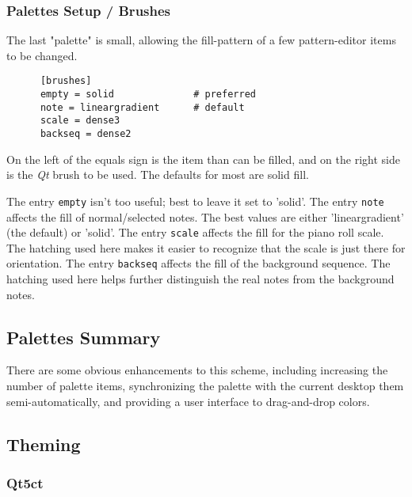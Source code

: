 \subsubsection{Palettes Setup / Brushes}
\label{subsubsec:palettes_setup_brushes}

   The last "palette" is small, allowing the fill-pattern of a few pattern-editor
   items to be changed.

   \begin{verbatim}
      [brushes]
      empty = solid              # preferred
      note = lineargradient      # default
      scale = dense3
      backseq = dense2
   \end{verbatim}

   On the left of the equals sign is the item than can be filled, and on the
   right side is the \textsl{Qt} brush to be used.  The defaults for most are
   solid fill.

   The entry \texttt{empty} isn't too useful; best to leave it set to 'solid'.
   The entry \texttt{note} affects the fill of normal/selected notes.
   The best values are either 'lineargradient' (the default) or 'solid'.
   The entry \texttt{scale} affects the fill for the piano roll scale.  The
   hatching used here makes it easier to recognize that the scale is just there
   for orientation.
   The entry \texttt{backseq} affects the fill of the background sequence.  The
   hatching used here helps further distinguish the real notes from the
   background notes.

\subsection{Palettes Summary}
\label{subsec:palettes_summary}

   There are some obvious enhancements to this scheme, including increasing the
   number of palette items, synchronizing the palette with the current desktop
   them semi-automatically, and providing a user interface to drag-and-drop
   colors.

\subsection{Theming}
\label{subsec:palettes_theming}

\subsubsection{Qt5ct}
\label{subsubsec:palettes_theming_qt5ct}

